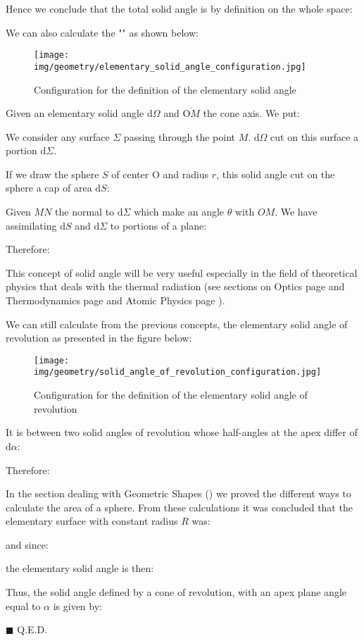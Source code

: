 	Hence we conclude that the total solid angle is by definition on the whole space:
	
	We can also calculate the "" as shown below:
	\begin{figure}[H]
		\centering
		\texttt{[image: img/geometry/elementary\_solid\_angle\_configuration.jpg]}
		\caption{Configuration for the definition of the elementary solid angle}
	\end{figure}
	Given an elementary solid angle $\mathrm{d}\Omega$ and $\overline{\text{O}M}$ the cone axis. We put:
	
	We consider any surface $\Sigma$ passing through the point $M$. $\mathrm{d}\Omega$ cut on this surface a portion $\mathrm{d}\Sigma$.
	
	If we draw the sphere $S$ of center $\text{O}$ and radius $r$, this solid angle cut on the sphere a cap of area $\mathrm{d}S$:
	
	Given $MN$ the normal to $\mathrm{d}\Sigma$ which make an angle $\theta$ with $OM$. We have assimilating $\mathrm{d}S$ and $\mathrm{d}\Sigma$ to portions of a plane:
	
	Therefore:
	
	This concept of solid angle will be very useful especially in the field of theoretical physics that deals with the thermal radiation (see sections on Optics page \pageref{solid angle optics} and Thermodynamics page \pageref{solid angle black body} and Atomic Physics page \pageref{solid angle atomic physics}).
	
	We can still calculate from the previous concepts, the elementary solid angle of revolution as presented in the figure below:
	\begin{figure}[H]
		\centering
		\texttt{[image: img/geometry/solid\_angle\_of\_revolution\_configuration.jpg]}
		\caption{Configuration for the definition of the elementary solid angle of revolution}
	\end{figure}
	It is between two solid angles of revolution whose half-angles at the apex differ of $\mathrm{d}\alpha$:
	
	Therefore:
	
	\begin{dem}
	In the section dealing with Geometric Shapes () we proved the different ways to calculate the area of a sphere. From these calculations it was concluded that the elementary surface with constant radius $R$ was:
	
	and since:
	
	the elementary solid angle is then:
	
	Thus, the solid angle defined by a cone of revolution, with an apex plane angle equal to $\alpha$ is given by:
	
	\begin{flushright}
		$\blacksquare$  Q.E.D.
	\end{flushright}
	\end{dem}
	
